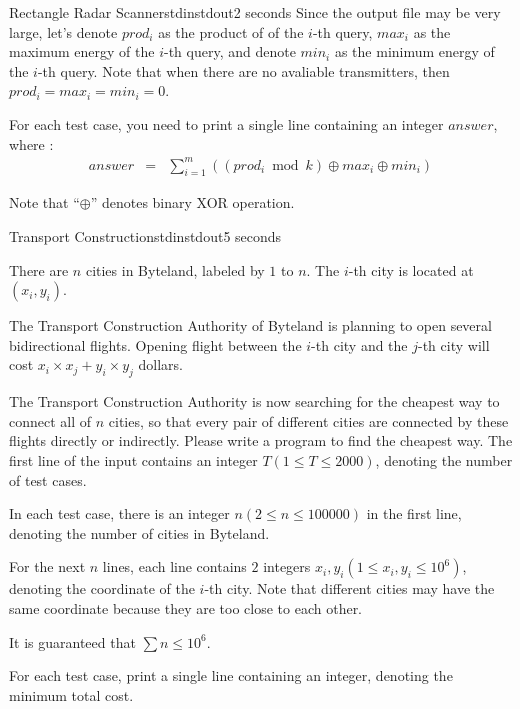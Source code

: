 \documentclass[11pt,a4paper,oneside]{article}
\newcommand{\timeLimit}{2 seconds}
\renewcommand{\defaultmemorylimit}{512 megabytes}
\begin{document}
\begin{problem}{Rectangle Radar Scanner}{stdin}{stdout}{\timeLimit}
\OutputFile
Since the output file may be very large, let's denote $prod_i$ as the product of of the $i$-th query, $max_i$ as the maximum energy of the $i$-th query, and denote $min_i$ as the minimum energy of the $i$-th query. Note that when there are no avaliable transmitters, then $prod_i=max_i=min_i=0$.\par
For each test case, you need to print a single line containing an integer $answer$, where :
\begin{eqnarray*}
answer&=&\sum_{i=1}^{m} ((prod_i\bmod k)\oplus max_i\oplus min_i)
\end{eqnarray*}\par
Note that ``$\oplus$'' denotes binary XOR operation.

\Examples
\begin{example}
%
\end{example}
\end{problem}
\renewcommand{\timeLimit}{5 seconds}
\renewcommand{\defaultmemorylimit}{512 megabytes}
\begin{problem}{Transport Construction}{stdin}{stdout}{\timeLimit}

There are $n$ cities in Byteland, labeled by $1$ to $n$. The $i$-th city is located at $(x_i,y_i)$.\par
The Transport Construction Authority of Byteland is planning to open several bidirectional flights. Opening flight between the $i$-th city and the $j$-th city will cost $x_i\times x_j+y_i\times y_j$ dollars.\par
The Transport Construction Authority is now searching for the cheapest way to connect all of $n$ cities, so that every pair of different cities are connected by these flights directly or indirectly. Please write a program to find the cheapest way.
\InputFile
The first line of the input contains an integer $T(1\leq T\leq2000)$, denoting the number of test cases.\par
In each test case, there is an integer $n(2\leq n\leq 100000)$ in the first line, denoting the number of cities in Byteland.\par
For the next $n$ lines, each line contains $2$ integers $x_i,y_i(1\leq x_i,y_i\leq 10^6)$, denoting the coordinate of the $i$-th city. Note that different cities may have the same coordinate because they are too close to each other.\par
It is guaranteed that $\sum n\leq 10^6$.

\OutputFile
For each test case, print a single line containing an integer, denoting the minimum total cost.

\Examples
\begin{example}
%
\end{example}
\end{problem}
\end{document}
